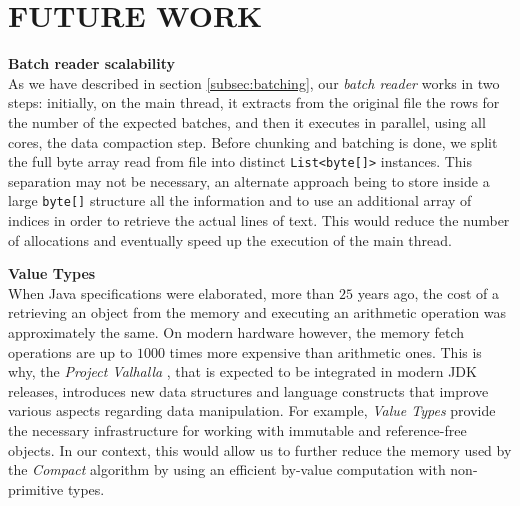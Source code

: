 \documentclass[a4paper,twoside]{article}
\begin{document}
\section{\uppercase{Future work}}
\label{sec:future}

\textbf{Batch reader scalability} \\
As we have described in section \ref{subsec:batching}, our {\textit{batch reader} } works in two steps: initially, on the main thread, it extracts from the original file the rows for the number of the expected batches, and then it executes in parallel, using all cores, the data compaction step.
Before chunking and batching is done, we split the full byte array read from file into distinct  \texttt{List<byte[]>} instances.
This separation may not be necessary, an alternate approach being to store inside a large \texttt{byte[]} structure all the information and to use an additional array of indices in order to retrieve the actual lines of text.
This would reduce the number of allocations and eventually speed up the execution of the main thread.


\textbf{Value Types} \\
When Java specifications were elaborated, more than $25$ years ago, the cost of a retrieving an object from the memory and executing an arithmetic operation was approximately the same.
On modern hardware however, the memory fetch operations are up to $1000$ times more expensive than arithmetic ones.
This is why, the {\textit{Project Valhalla} } \cite{jdk:valhalla}, that is expected to be integrated in modern JDK releases, introduces new data structures and language constructs that improve various aspects regarding data manipulation.
For example, {\textit{Value Types} } provide the necessary infrastructure for working with immutable and reference-free objects.
In our context, this would allow us to further reduce the memory used by the {\textit{Compact} } algorithm by using an efficient by-value computation with non-primitive types.
\end{document}
